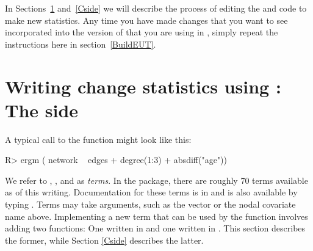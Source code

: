 \documentclass[nojss]{jss}
\begin{document}
In Sections~\ref{Rside} and~\ref{Cside} we will describe the process of editing the  and  code to make new statistics.  Any time you have made changes that you want to see incorporated into the version of  that you are using in , simply repeat the instructions here in section~\ref{BuildEUT}.

\section[Writing change statistics using ergm.userterms:  The R side]%
{Writing change statistics using :  The  side}
\label{Rside}

A typical call to the  function might look like this:
\begin{CodeChunk}
\begin{CodeInput}
R> ergm ( network ~ edges + degree(1:3) + absdiff("age"))
\end{CodeInput}
\end{CodeChunk}
We refer to , , and  as {\em terms}.
In the  package, there are roughly 70 terms available
as of this writing.
Documentation for these terms is
 in \citet{ergmtermsjss} and is also available by typing .
 Terms may take arguments, such as the vector  or the nodal covariate
 name  above.  Implementing a new term that can be used by
 the  function involves adding two functions:  One written in 
 and one written in .  This section describes the former, while Section \ref{Cside}
 describes the latter.
\end{document}
